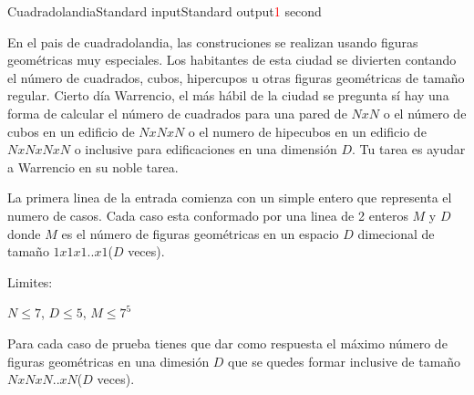 \begin{problem}{Cuadradolandia}{Standard input}{Standard output}{\textcolor{red}{1} second}{}

En el pais de cuadradolandia, las construciones se realizan usando figuras geométricas muy especiales. Los habitantes de esta ciudad se divierten contando el número de cuadrados, cubos, hipercupos u otras figuras geométricas de tamaño regular. Cierto día Warrencio, el más hábil de la ciudad se pregunta sí hay una forma de calcular el número de cuadrados para una pared de $NxN$ o el número de cubos en un edificio de $NxNxN$ o el numero de hipecubos en un edificio de $NxNxNxN$ o inclusive para edificaciones en una dimensión $D$. Tu tarea es ayudar a Warrencio en su noble tarea.

\InputFile
La primera linea de la entrada comienza con un simple entero que representa el numero de casos. Cada caso esta conformado por una linea de 2 enteros $M$ y $D$ donde $M$ es el número de figuras geométricas en un espacio $D$ dimecional de tamaño $1x1x1..x1$($D$ veces). 

Limites:

$N \leq 7$, $D \leq 5$, $M \leq 7^5$ 

\OutputFile
Para cada caso de prueba tienes que dar como respuesta el máximo número de figuras geométricas en una dimesión $D$ que se quedes formar inclusive de tamaño $NxNxN..xN$($D$ veces). 


\Example

\begin{example}
\end{example}

\end{problem}
